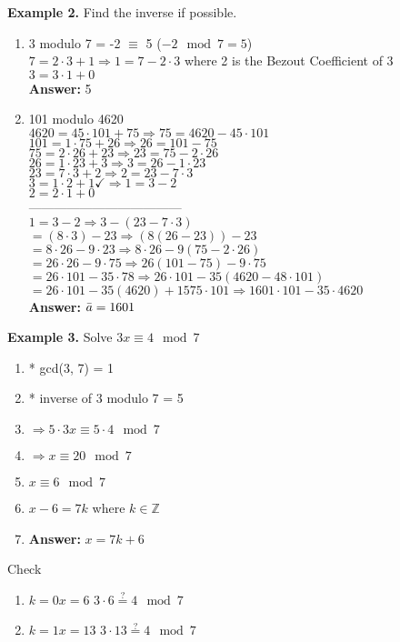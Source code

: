 \documentclass [12pt]{article}
\begin{document}
\pagebreak
\noindent\textbf{Example 2.} Find the inverse if possible.
\begin{enumerate}[\quad(a)]
    \item 3 modulo 7 = -2 $\equiv$ 5 \quad ($-2\mod7=5$)\\
    \quad $7=2\cdot3+1\Rightarrow1=7-2\cdot3$ where 2 is the Bezout Coefficient of 3\\
    \quad $3 = 3\cdot1+0$ \\
    \quad\textbf{Answer:} 5
    \item 101 modulo 4620\\
    \quad $4620=45\cdot101+75 \Rightarrow 75=4620-45\cdot101$\\
    \quad $101 = 1\cdot75+26\Rightarrow26=101-75$\\
    \quad $75=2\cdot26+23\Rightarrow23=75-2\cdot26$\\
    \quad $26=1\cdot23+3\Rightarrow3=26-1\cdot23$\\
    \quad $23=7\cdot3+2\Rightarrow2=23-7\cdot3$\\
    \quad $3=1\cdot2+1$\quad$\checkmark$\quad$\Rightarrow1=3-2$\\
    \quad $2=2\cdot1+0$\\
    ------------------------------------\\
    \quad $1=3-2 \Rightarrow 3-(23-7\cdot3)$\\
    \quad $=(8\cdot3)-23\Rightarrow(8(26-23))-23$\\
    \quad $=8\cdot26-9\cdot23\Rightarrow8\cdot26-9(75-2\cdot26)$\\
    \quad $=26\cdot26-9\cdot75\Rightarrow26(101-75)-9\cdot75$\\
    \quad $=26\cdot101-35\cdot78\Rightarrow26\cdot101-35(4620-48\cdot101)$\\
    \quad $=26\cdot101-35(4620)+1575\cdot101\Rightarrow1601\cdot101-35\cdot4620$\\
    \quad \textbf{Answer:} $\Bar{a} = 1601$
\end{enumerate}
\vspace{0.2in}
\noindent\textbf{Example 3.} Solve $3x\equiv4\mod7$
\begin{enumerate}[\quad]
    \item * gcd(3, 7) = 1 \quad\checkmark
    \item * inverse of 3 modulo 7 = 5
    \item $\Rightarrow5\cdot 3x\equiv5\cdot4\mod7$
    \item $\Rightarrow x \equiv 20\mod 7$
    \item $x\equiv6\mod7$
    \item $x-6=7k$ where $k\in\mathbb{Z}$
    \item \textbf{Answer:} $x=7k+6$
\end{enumerate}
Check
\begin{enumerate}[\quad]
    \item $k=0$\quad $x=6$ \quad $3\cdot6\stackrel{?}{=}4\mod7$ \quad \checkmark
    \item $k=1$\quad $x=13$ \quad $3\cdot13\stackrel{?}{=}4\mod7$ \quad \checkmark
\end{enumerate}
\pagebreak
\end{document}
